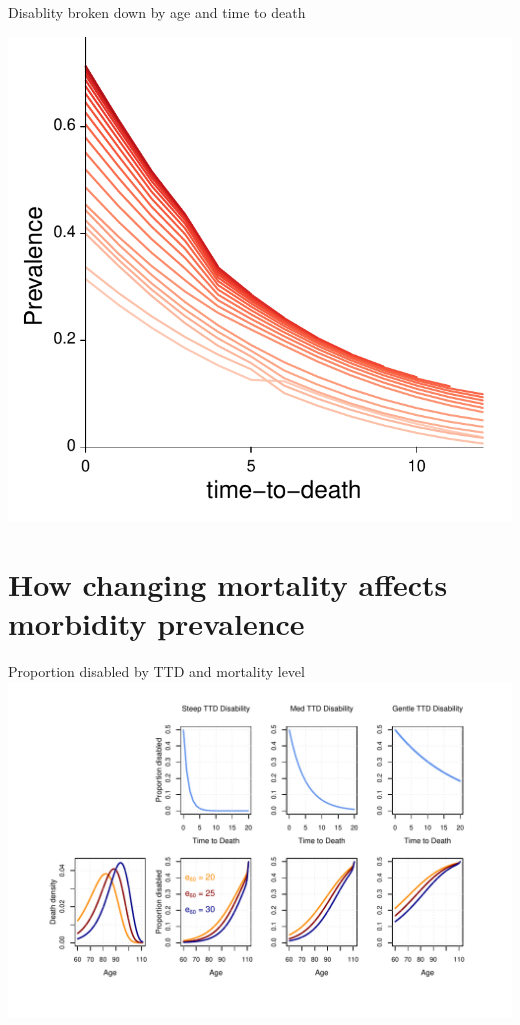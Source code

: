 \documentclass[20pt]{beamer}
\begin{document}
\begin{frame}{Disablity broken down by age and time to death}{}
\begin{center}
\includegraphics[scale=.8]{Figures/IADLttdlines.pdf}
\end{center}
\end{frame}

\section{How changing mortality affects morbidity prevalence}

\begin{frame}{Proportion disabled by TTD and mortality level}
\includegraphics[trim=1cm 0 0 0, clip,
width=1.1\linewidth]{Figures/schematic_pres.pdf}
\end{frame}
\end{document}
